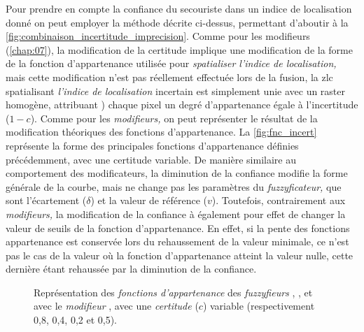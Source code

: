 Pour prendre en compte la confiance du secouriste dans un indice de
localisation donné on peut employer la méthode décrite ci-dessus,
permettant d'aboutir à la
\autoref{fig:combinaison_incertitude_imprecision}. Comme pour les
modifieurs (\autoref{chap:07}), la modification de la certitude
implique une modification de la forme de la fonction d'appartenance
utilisée pour \emph{spatialiser l'indice de localisation,} mais cette
modification n'est pas réellement effectuée lors de la fusion, la
\ac{zlc} spatialisant \emph{l'indice de localisation} incertain est
simplement unie avec un raster homogène, attribuant ) chaque pixel un
degré d'appartenance égale à l'incertitude (\(1-c\)). Comme pour les
\emph{modifieurs,} on peut représenter le résultat de la modification
théoriques des fonctions d'appartenance. La \autoref{fig:fnc_incert}
représente la forme des principales fonctions d'appartenance définies
précédemment, avec une certitude variable. De manière similaire au
comportement des modificateurs, la diminution de la confiance modifie
la forme générale de la courbe, mais ne change pas les paramètres du
\emph{fuzzyficateur,} que sont l'écartement (\(\delta\)) et la valeur
de référence (\(v\)). Toutefois, contrairement aux \emph{modifieurs,}
la modification de la confiance à également pour effet de changer la
valeur de seuils de la fonction d'appartenance. En effet, si la pente
des fonctions appartenance est conservée lors du rehaussement de la
valeur minimale, ce n'est pas le cas de la valeur où la fonction
d'appartenance atteint la valeur nulle, cette dernière étant rehaussée
par la diminution de la confiance.

\begin{figure}
  \centering  \subfloat[\label{fig:fnc_app_inc}]{}\hfill
  \subfloat[\label{fig:fnc_app_inc_2}]{}

  \subfloat[\label{fig:fnc_app_inc_3}]{}\hfill
  \subfloat[\label{fig:fnc_app_inc_4}]{}
  \caption[Représentation des \emph{fonctions d'appartenance} de
  différents \emph{fuzzyfieurs} avec une
  \emph{incertitude}]{Représentation des \emph{fonctions
      d'appartenance} des \emph{fuzzyfieurs}
    \protect{} \protect{},
    \protect{} \protect{},
    \protect{} \protect{}
    et \protect{} avec le \emph{modifieur}
    \protect{} \protect{}, avec
    une \emph{certitude} (\(c\)) variable (respectivement 0,8, 0,4,
    0,2 et 0,5).}
  \label{fig:fnc_incert}
\end{figure}

